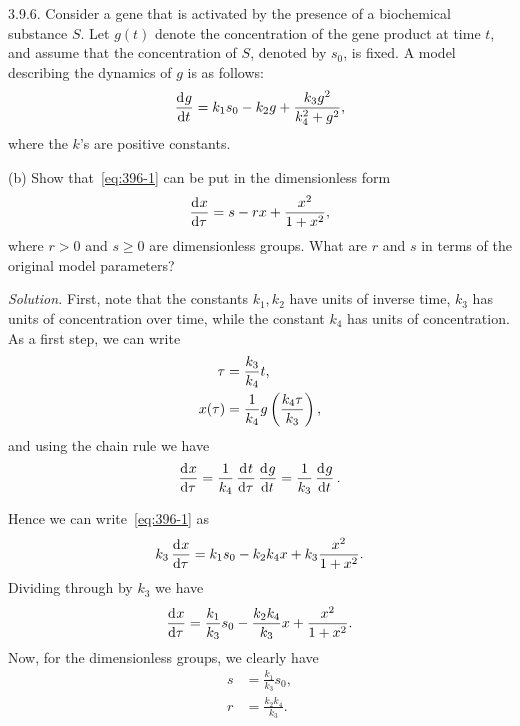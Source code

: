 \documentclass{article}
\begin{document}
\newpage

3.9.6. Consider a gene that is activated by the presence of a
biochemical substance $S$. Let $g(t)$ denote the concentration of the
gene product at time $t$, and assume that the concentration of $S$,
denoted by $s_0$, is fixed. A model describing the dynamics of $g$
is as follows:
%
\begin{equation}
    \dod{g}{t} = k_1 s_0 - k_2 g + \frac{k_3 g^2}{k_4^2 + g^2}
    \label{eq:396-1}
    ,
\end{equation}
%
where the $k$'s are positive constants.

(b) Show that~\eqref{eq:396-1} can be put in the dimensionless form
%
\begin{equation*}
    \dod{x}{\tau} = s - r x + \frac{x^2}{1 + x^2}
    ,
\end{equation*}
%
where $r > 0$ and $s \geq 0$ are dimensionless groups. What are $r$ and
$s$ in terms of the original model parameters?

\textit{Solution.}
First, note that the constants $k_1, k_2$ have units of inverse time,
$k_3$ has units of concentration over time, while the constant $k_4$ has
units of concentration. As a first step, we can write
%
\begin{align*}
    \tau &= \frac{k_3}{k_4} t, \\
    x(\tau) &= \frac{1}{k_4} g\del{\frac{k_4 \tau}{k_3}}
    ,
\end{align*}
%
and using the chain rule we have
%
\begin{equation*}
    \dod{x}{\tau} = \frac{1}{k_4} \dod{t}{\tau} \dod{g}{t} = \frac{1}{k_3} \dod{g}{t}
    .
\end{equation*}

Hence we can write~\eqref{eq:396-1} as
%
\begin{equation*}
    k_3 \dod{x}{\tau} = k_1 s_0 - k_2 k_4 x + k_3 \frac{x^2}{1 + x^2}
    .
\end{equation*}
%
Dividing through by $k_3$ we have
%
\begin{equation*}
    \dod{x}{\tau} = \frac{k_1}{k_3} s_0 - \frac{k_2 k_4}{k_3} x + \frac{x^2}{1 + x^2}
    .
\end{equation*}
%
Now, for the dimensionless groups, we clearly have
%
\begin{align*}
    s &= \frac{k_1}{k_3} s_0, \\
    r &= \frac{k_2 k_4}{k_3}
    .
\end{align*}

\newpage
\end{document}
